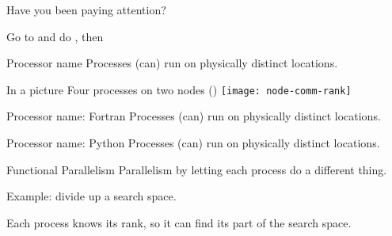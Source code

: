 \begin{numberedframe}{Have you been paying attention?}
  
\end{numberedframe}

\begin{exerciseframe}
  

  Go to  and do ,
  then 
\end{exerciseframe}

\begin{numberedframe}{Processor name}
  Processes (can) run on physically distinct locations.

\end{numberedframe}

\begin{numberedframe}{In a picture}
  Four processes on two nodes ()
  \texttt{[image: node-comm-rank]}
\end{numberedframe}

\begin{numberedframe}[f]{Processor name: Fortran}
  Processes (can) run on physically distinct locations.

\end{numberedframe}

\begin{numberedframe}[p]{Processor name: Python}
  Processes (can) run on physically distinct locations.

\end{numberedframe}




\begin{numberedframe}{Functional Parallelism}
  Parallelism by letting each process do a different thing.

  Example: divide up a search space.

  Each process knows its rank, so it can find its part of the search space.
\end{numberedframe}

\begin{exerciseframe}[prime]
  
\end{exerciseframe}

\begin{exerciseframe}
  
\end{exerciseframe}

\endinput

\begin{numberedframe}\frametitle{}
\begin{lstlisting}
  
\end{lstlisting}
\end{numberedframe}

